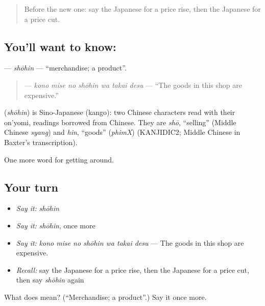 \label{lesson:JA-C421-shouhin}



\begin{quote}
Before the new one: say the Japanese for a price rise, then the Japanese for a price cut.
\end{quote}

\subsection*{You'll want to know: }
\textbf{} — \emph{shōhin} — \textquotedblleft{}merchandise; a product\textquotedblright{}.

\begin{quote}
\textbf{   } — \emph{kono mise no shōhin wa takai desu} — \textquotedblleft{}The goods in this shop are expensive.\textquotedblright{}
\end{quote}

\begin{cousinweb}
\textbf{} (\emph{shōhin}) is Sino-Japanese (kango): two Chinese characters read with their on'yomi, readings borrowed from Chinese. They are \emph{shō}, \textquotedblleft{}selling\textquotedblright{} (Middle Chinese \emph{syang}) and \emph{hin}, \textquotedblleft{}goods\textquotedblright{} (\emph{phimX}) (KANJIDIC2; Middle Chinese in Baxter's transcription).
\end{cousinweb}

\begin{grammarlens}[title={What you've built}]
One more word for getting around.
\end{grammarlens}

\subsection*{Your turn}
\begin{itemize}
\raggedright
  \item \emph{Say it:} \emph{shōhin}
  \item \emph{Say it:} \emph{shōhin}, once more
  \item \emph{Say it:} \emph{kono mise no shōhin wa takai desu} — The goods in this shop are expensive.
  \item \emph{Recall:} say the Japanese for a price rise, then the Japanese for a price cut, then say \emph{shōhin} again
\end{itemize}

\begin{tcolorbox}[breakable,colback=teal!4,colframe=teal!35!black,title={Before you move on}]
What does  mean? (\textquotedblleft{}Merchandise; a product\textquotedblright{}.) Say it once more.
\end{tcolorbox}
